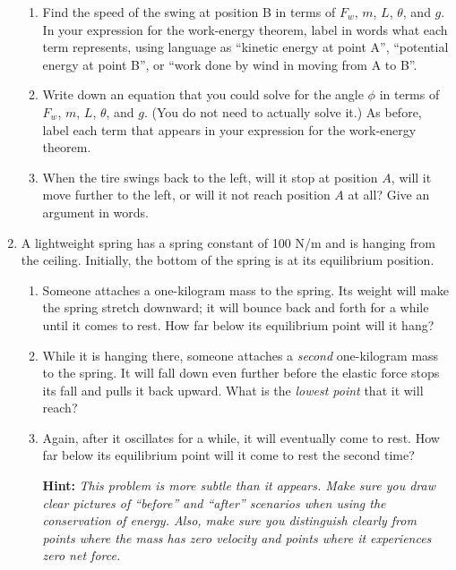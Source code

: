 \documentclass[12pt]{article}
\begin{document}
\begin{enumerate}
	
	

	
	
	\begin{enumerate}
		\item Find the speed of the swing at position B in terms of $F_w$, $m$, $L$, $\theta$, and $g$. In your expression for the work-energy theorem, label in words what each term represents, using language as ``kinetic energy at point A'', ``potential energy at point B'', or ``work done by wind in moving from A to B''.
		\item Write down an equation that you could solve for the angle $\phi$ in terms of $F_w$, $m$, $L$, $\theta$, and $g$. (You do not need to actually solve it.) As before, label each term that appears in your expression for the work-energy theorem.
		
		\item When the tire swings back to the left, will it stop at position $A$, will it move further to the left, or will it not reach position $A$ at all? Give an argument in words.
	\end{enumerate} 
	
	
	\vspace{0.5in}


\item A lightweight spring has a spring constant of 100 N/m and is hanging from the ceiling. Initially, the bottom of the spring is at its equilibrium position.

\begin{enumerate}
\item Someone attaches a one-kilogram mass to the spring. Its weight will make the spring stretch downward; it will bounce back and forth for a while until it comes to rest. How far below its equilibrium point will it hang?

\item While it is hanging there, someone attaches a {\it second} one-kilogram mass to the spring. It will fall down even further before the elastic force stops its fall and pulls it back upward. What is the {\it lowest point} that it will reach?

\item Again, after it oscillates for a while, it will eventually come to rest. How far below its equilibrium point will it come to rest the second time?

{\bf Hint: } {\it This problem is more subtle than it appears. Make sure you draw clear pictures of ``before'' and ``after'' scenarios when using the conservation of energy. Also, make sure you distinguish clearly from points where the mass has {\rm zero velocity} and points where it experiences {\rm zero net force}.}






\end{enumerate}
\end{enumerate}
\end{document}
